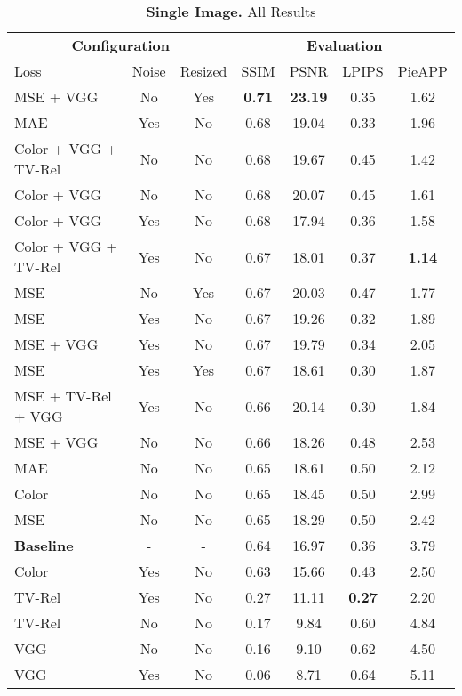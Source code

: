 \begin{table}[ht]
    \scriptsize
    \centering
    \caption{
        \textbf{Single Image.} All Results}
    \begin{tabular}{lcc|cccc}
        \toprule
        \multicolumn{3}{c}{\textbf{Configuration}}& \multicolumn{4}{c}{\textbf{Evaluation}} \\
        Loss & Noise & Resized & SSIM & PSNR & LPIPS & PieAPP \\
        \midrule
        MSE + VGG & No & Yes & \textbf{0.71} & \textbf{23.19} & 0.35 & 1.62 \\
        MAE & Yes & No & 0.68 & 19.04 & 0.33 & 1.96 \\
        Color + VGG + TV-Rel & No & No & 0.68 & 19.67 & 0.45 & 1.42 \\
        Color + VGG & No & No & 0.68 & 20.07 & 0.45 & 1.61 \\
        Color + VGG & Yes & No & 0.68 & 17.94 & 0.36 & 1.58 \\
        Color + VGG + TV-Rel & Yes & No  & 0.67 & 18.01 & 0.37 & \textbf{1.14} \\
        MSE & No & Yes & 0.67 & 20.03 & 0.47 & 1.77 \\
        MSE & Yes & No & 0.67 & 19.26 & 0.32 & 1.89 \\
        MSE + VGG & Yes & No & 0.67 & 19.79 & 0.34 & 2.05 \\
        MSE & Yes & Yes & 0.67 & 18.61 & 0.30 & 1.87 \\
        MSE + TV-Rel + VGG & Yes & No & 0.66 & 20.14 & 0.30 & 1.84 \\
        MSE + VGG & No & No & 0.66 & 18.26 & 0.48 & 2.53 \\
        MAE & No & No & 0.65 & 18.61 & 0.50 & 2.12 \\
        Color & No & No & 0.65 & 18.45 & 0.50 & 2.99 \\
        MSE & No & No & 0.65 & 18.29 & 0.50 & 2.42 \\
        \textbf{Baseline} & - & - & 0.64 & 16.97 & 0.36 & 3.79 \\
        \midrule
        Color & Yes & No & 0.63 & 15.66 & 0.43 & 2.50 \\
        TV-Rel & Yes & No & 0.27 & 11.11 & \textbf{0.27} & 2.20 \\
        TV-Rel & No & No & 0.17 & 9.84 & 0.60 & 4.84 \\
        VGG & No & No & 0.16 & 9.10 & 0.62 & 4.50 \\
        VGG & Yes & No & 0.06 & 8.71 & 0.64 & 5.11 \\
        \bottomrule
    \end{tabular}
    \label{tab:all-single-image-results}
\end{table}

